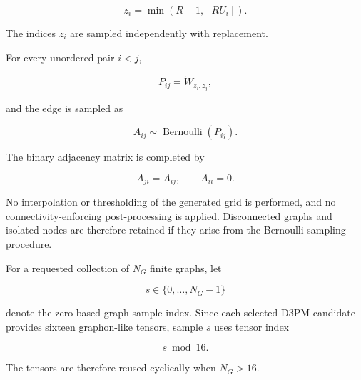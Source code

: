 \[
z_i
=
\min
\left(
R-1,
\left\lfloor RU_i \right\rfloor
\right).
\]

The indices \(z_i\) are sampled independently with replacement.

For every unordered pair \(i<j\),

\[
P_{ij}
=
\widetilde{W}_{z_i,z_j},
\]

and the edge is sampled as

\[
A_{ij}
\sim
\operatorname{Bernoulli}
\left(
P_{ij}
\right).
\]

The binary adjacency matrix is completed by

\[
A_{ji}=A_{ij},
\qquad
A_{ii}=0.
\]

No interpolation or thresholding of the generated grid is performed, and no connectivity-enforcing post-processing is applied. Disconnected graphs and isolated nodes are therefore retained if they arise from the Bernoulli sampling procedure.

For a requested collection of \(N_G\) finite graphs, let

\[
s\in\{0,\ldots,N_G-1\}
\]

denote the zero-based graph-sample index. Since each selected D3PM candidate provides sixteen graphon-like tensors, sample \(s\) uses tensor index

\[
s\bmod 16.
\]

The tensors are therefore reused cyclically when \(N_G>16\).

